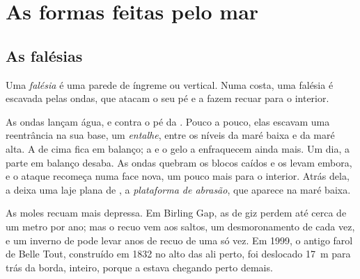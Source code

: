 \section{As formas feitas pelo mar}

\subsection{As falésias}

\begin{definition}[Falésia]\label{def:g9:landforms:cliff}
Uma \emph{falésia} é uma parede de  íngreme
ou vertical. Numa costa, uma falésia é escavada pelas ondas, que atacam o
seu pé e a fazem recuar para o interior.
\end{definition}

As ondas lançam água,  e  contra o pé da . Pouco a
pouco, elas escavam uma reentrância na sua base, um \emph{entalhe}, entre
os níveis da maré baixa e da maré alta. A  de cima fica em balanço;
a  e o gelo a enfraquecem ainda mais. Um dia, a parte em balanço
desaba. As ondas quebram os blocos caídos e os levam embora, e o ataque
recomeça numa face nova, um pouco mais para o interior. Atrás dela, a
 deixa uma laje plana de , a \emph{plataforma de
abrasão}, que aparece
na maré baixa.

As  moles recuam mais depressa. Em Birling Gap, as  de giz
perdem até cerca de um metro por ano; mas o recuo vem aos saltos, um
desmoronamento de cada vez, e um inverno de  pode levar anos
de recuo de uma só vez. Em 1999, o antigo farol de Belle Tout, construído
em 1832 no alto das  ali perto, foi deslocado \qty{17}{m} para
trás da borda, inteiro, porque a  estava chegando perto demais.

